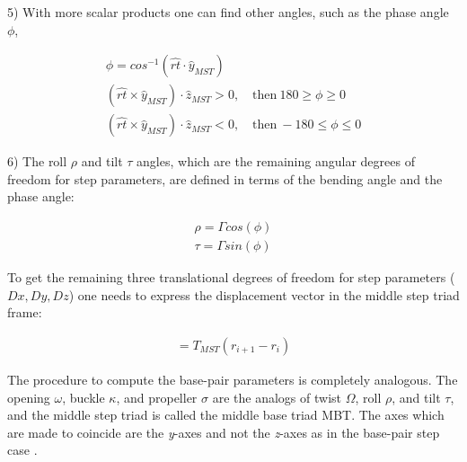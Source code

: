 
5) With more scalar products one  can find other angles, such as the phase
angle $\phi$,

\begin{gather}
\phi = cos^{-1}(\hat{rt} \cdot \hat{y}_{MST})\\
(\hat{rt} \times \hat{y}_{MST}) \cdot \hat{z}_{MST} > 0, \quad \textrm{then} \ 180 \geq \phi \geq 0\\
(\hat{rt} \times \hat{y}_{MST}) \cdot \hat{z}_{MST} < 0, \quad \textrm{then} \ -180 \leq \phi \leq 0
\end{gather}

6) The  roll $\rho$  and tilt $\tau$  angles, which are  the remaining
angular degrees of  freedom for step parameters, are  defined in terms
of the bending angle and the phase angle:

\begin{gather}
\rho = \Gamma cos (\phi)\\
\tau = \Gamma sin (\phi)
\end{gather}

To  get the remaining  three translational degrees of  freedom for
step  parameters  ($Dx,  Dy,  Dz$)  one  needs  to  express  the
displacement vector in the middle step triad frame:

\begin{gather}
[D_xD_yD_z]=T_{MST}(r_{i+1} - r_{i})
\end{gather}

The  procedure  to  compute  the base-pair  parameters  is  completely
analogous.   The  opening  $\omega$,  buckle $\kappa$,  and  propeller
$\sigma$  are the  analogs of  twist $\Omega$,  roll $\rho$,  and tilt
$\tau$, and the middle step triad is called the middle base triad MBT.
The axes  which are made to  coincide are the  \textit{y}-axes and not
the \textit{z}-axes as in the base-pair step case \cite{lu1997}.

